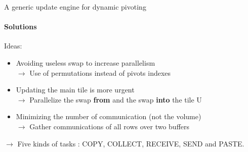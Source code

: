 \begin{frame}{A generic update engine for dynamic pivoting}
\framesubtitle{Solutions}
Ideas:
\begin{itemize}
\item Avoiding useless swap to increase parallelism\\
$\rightarrow$ Use of permutations instead of pivots indexes
\item Updating the main tile is more urgent\\
$\rightarrow$ Parallelize the swap \textbf{from} and the swap \textbf{into} the tile U
\item Minimizing the number of communication (not the volume)\\
$\rightarrow$ Gather communications of all rows over two buffers
\end{itemize}
\pause
\begin{exampleblock}{}
$\rightarrow$ Five kinds of tasks : COPY, COLLECT, RECEIVE, SEND and PASTE.
\end{exampleblock}{}
\end{frame}

